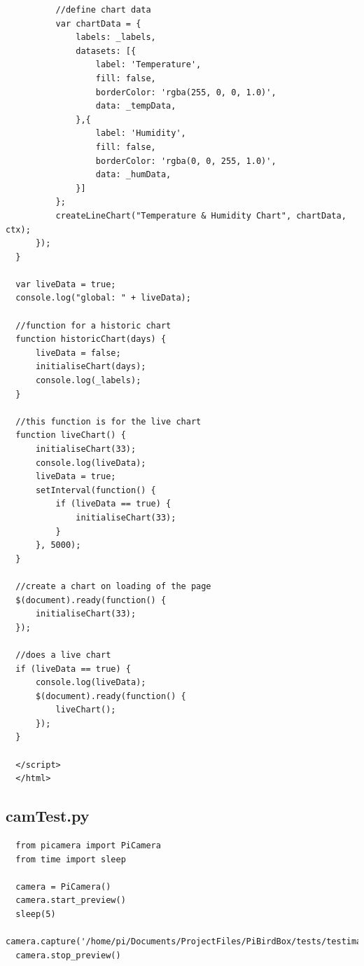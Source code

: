 \documentclass[10pt,a4paper]{article}
\begin{document}
\begin{verbatim}
          //define chart data
          var chartData = {
              labels: _labels,
              datasets: [{
                  label: 'Temperature',
                  fill: false,
                  borderColor: 'rgba(255, 0, 0, 1.0)',
                  data: _tempData,
              },{
                  label: 'Humidity',
                  fill: false,
                  borderColor: 'rgba(0, 0, 255, 1.0)',
                  data: _humData,
              }]
          };
          createLineChart("Temperature & Humidity Chart", chartData, ctx);
      });
  }

  var liveData = true;
  console.log("global: " + liveData);

  //function for a historic chart
  function historicChart(days) {
      liveData = false;
      initialiseChart(days);
      console.log(_labels);
  }

  //this function is for the live chart
  function liveChart() {
      initialiseChart(33);
      console.log(liveData);
      liveData = true;
      setInterval(function() {
          if (liveData == true) {
              initialiseChart(33);
          }
      }, 5000);
  }

  //create a chart on loading of the page
  $(document).ready(function() {
      initialiseChart(33);
  });

  //does a live chart
  if (liveData == true) {
      console.log(liveData);
      $(document).ready(function() {
          liveChart();
      });
  }

  </script>
  </html>
\end{verbatim}

\subsection{camTest.py}
\begin{verbatim}
  from picamera import PiCamera
  from time import sleep

  camera = PiCamera()
  camera.start_preview()
  sleep(5)
  camera.capture('/home/pi/Documents/ProjectFiles/PiBirdBox/tests/testimage.jpg')
  camera.stop_preview()
\end{verbatim}
\end{document}
